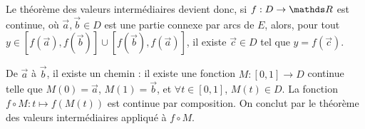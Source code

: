 \begin{thmn}
	Le théorème des valeurs intermédiaires devient donc, si $f : D \to \R$ est continue, où $\vec{a}, \vec{b} \in D$ est une partie connexe par arcs de $E$, alors, pour tout $y \in [f(\vec{a}),f(\vec{b})] \cup [f(\vec{b}),f(\vec{a})]$, il existe $\vec{c} \in D$ tel que $y = f(\vec{c})$.
\end{thmn}

\begin{prv}
	De $\vec{a}$ à $\vec{b}$, il existe un chemin : il existe une fonction $M : [0,1] \to D$ continue telle que $M(0) = \vec{a}$, $M(1) = \vec{b}$, et $\forall t \in [0,1]$, $M(t) \in D$.
	La fonction $f \circ M : t \mapsto f(M(t))$ est continue par composition.
	On conclut par le théorème des valeurs intermédiaires appliqué à $f \circ M$.
\end{prv}

